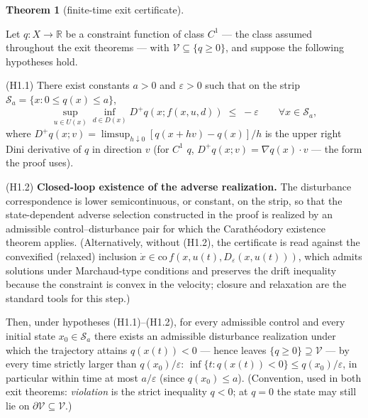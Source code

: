 \documentclass[11pt]{article}
\theoremstyle{definition}
\newtheorem{theorem}{Theorem}
\begin{document}
\begin{theorem}[finite-time exit certificate]\label{thm:exit}

Let \(q : X \to \mathbb{R}\) be a constraint function of class \(C^1\) --- the class assumed throughout the exit theorems --- with
\(\mathcal{V} \subseteq \{ q \ge 0 \}\), and suppose the following
hypotheses hold.

(H1.1) There exist constants \(a > 0\) and \(\varepsilon > 0\) such that
on the strip \(\mathcal{S}_a = \{ x : 0 \le q(x) \le a \}\),
\[\sup_{u \in U(x)} \inf_{d \in D(x)} D^+ q(x; f(x,u,d)) \;\le\; -\varepsilon \qquad \forall x \in \mathcal{S}_a, \tag{1}\]
where \(D^+ q(x; v) = \limsup_{h \downarrow 0} [q(x + hv) - q(x)]/h\) is
the upper right Dini derivative of \(q\) in direction \(v\) (for \(C^1\)
\(q\), \(D^+ q(x; v) = \nabla q(x) \cdot v\) --- the form the proof
uses).

(H1.2) \textbf{Closed-loop existence of the adverse realization.} The
disturbance correspondence is lower semicontinuous, or constant, on the
strip, so that the state-dependent adverse selection constructed in the
proof is realized by an admissible control--disturbance pair for which
the Carath\'eodory existence theorem applies. (Alternatively, without (H1.2), the certificate is read against the convexified (relaxed) inclusion
\(\dot x \in \mathrm{co}\, f(x, u(t), D_{\varepsilon}(x, u(t)))\), which
admits solutions under Marchaud-type conditions and preserves the drift
inequality because the constraint is convex in the velocity; closure and
relaxation are the standard tools for this step.)

Then, under hypotheses (H1.1)--(H1.2), for every
admissible control and every initial state \(x_0 \in \mathcal{S}_a\)
there exists an admissible disturbance realization under which the
trajectory attains \(q(x(t)) < 0\) --- hence leaves
\(\{ q \ge 0 \} \supseteq \mathcal{V}\) --- by every time strictly
larger than \(q(x_0)/\varepsilon\):
\(\inf\{ t : q(x(t)) < 0 \} \le q(x_0)/\varepsilon\), in particular
within time at most \(a/\varepsilon\) (since \(q(x_0) \le a\)).
(Convention, used in both exit theorems: \emph{violation} is the strict
inequality \(q < 0\); at \(q = 0\) the state may still lie on
\(\partial \mathcal{V} \subseteq \mathcal{V}\).)

\end{theorem}
\end{document}

